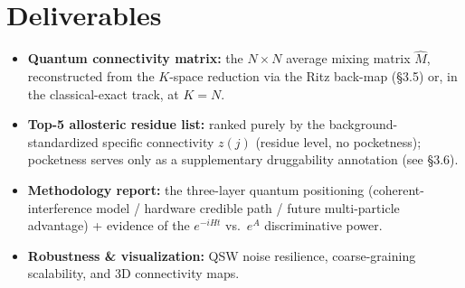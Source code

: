 \documentclass[11pt,a4paper]{article}
\newcommand{\mhat}{\hat{M}}
\newcommand{\lead}[1]{\textbf{#1}}
\begin{document}
\section{Deliverables}
\begin{itemize}
\item \lead{Quantum connectivity matrix:} the $N\times N$ average mixing matrix $\mhat$, reconstructed from the $K$-space reduction via the Ritz back-map (\S3.5) or, in the classical-exact track, at $K=N$.
\item \lead{Top-5 allosteric residue list:} ranked purely by the background-standardized specific connectivity $z(j)$ (residue level, no pocketness); pocketness serves only as a supplementary druggability annotation (see \S3.6).
\item \lead{Methodology report:} the three-layer quantum positioning (coherent-interference model / hardware credible path / future multi-particle advantage) + evidence of the $e^{-iHt}$ vs.\ $e^{A}$ discriminative power.
\item \lead{Robustness \& visualization:} QSW noise resilience, coarse-graining scalability, and 3D connectivity maps.
\end{itemize}

\end{document}
